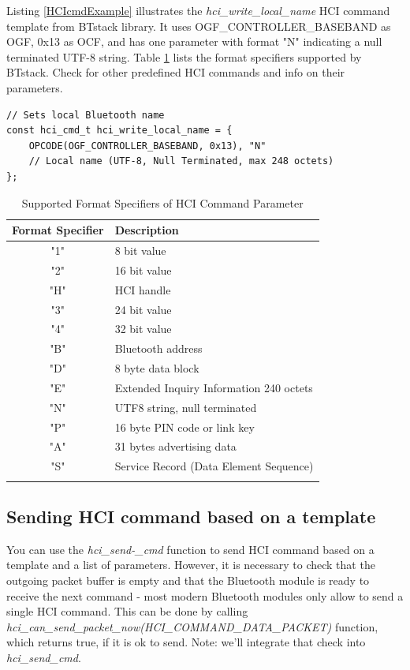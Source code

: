 \documentclass[a4paper,titlepage,oneside,12pt]{amsart} %
\begin{document}
Listing \ref{HCIcmdExample} illustrates the \emph{hci\_write\_local\_name} HCI command template from \mbox{BTstack} library. It uses  OGF\_CONTROLLER\_BASEBAND as OGF, 0x13 as OCF, and has one parameter with format "N" indicating a null terminated UTF-8 string. Table \ref{table:hciformat} lists the format specifiers supported by BTstack. Check  for other predefined HCI commands and info on their parameters.

\begin{lstlisting}[caption= Example of HCI command template., label=HCIcmdExample]
// Sets local Bluetooth name
const hci_cmd_t hci_write_local_name = {
    OPCODE(OGF_CONTROLLER_BASEBAND, 0x13), "N"
    // Local name (UTF-8, Null Terminated, max 248 octets)
};
\end{lstlisting}

\begin{table}\centering
\caption{Supported Format Specifiers of HCI Command Parameter}
\begin{tabular}{cl}\toprule
Format Specifier & Description\\ 
\midrule
"1" & 8 bit value \\
"2" & 16 bit value \\
"H" & HCI handle \\
"3" & 24 bit value \\
"4" & 32 bit value \\
"B" & Bluetooth address \\
"D" & 8 byte data block \\
"E" & Extended Inquiry Information 240 octets \\
"N" & UTF8 string, null terminated \\
"P" & 16 byte PIN code or link key \\
"A" & 31 bytes advertising data \\
"S" & Service Record (Data Element Sequence)\\
\bottomrule
\label{table:hciformat}
\end{tabular}
\end{table}

\subsection{Sending  HCI command based on a template}
You can use the \emph{hci\_send-\_cmd} function to send HCI command based on a template and a list of parameters. However, it is necessary to check that the outgoing packet buffer is empty and that the Bluetooth module is ready to receive the next command - most modern Bluetooth modules only allow  to send a single HCI command. This can be done by calling \emph{hci\_can\_send\_packet\_now(HCI\_COMMAND\_DATA\_PACKET)} function, which returns true, if it is ok to send. Note: we'll integrate that check into \emph{hci\_send\_cmd}.
\end{document}

